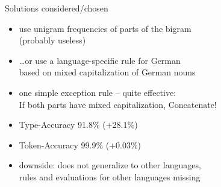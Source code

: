 \begin{frame}
  {Solutions considered\slash chosen}
  \begin{itemize}
    \item use unigram frequencies of parts of the bigram\\
      (probably useless)
    \item \ldots or use a language-specific rule for German\\
      based on mixed capitalization of German nouns
    \item \alert{one} simple exception rule -- quite effective:\\
      \alert{If both parts have mixed capitalization, Concatenate!}
    \item \alert{Type-Accuracy 91.8\% (+28.1\%)}
    \item \alert{Token-Accuracy 99.9\% (+0.03\%)}
    \item downside: does not generalize to other languages,\\
      rules and evaluations for other languages missing
  \end{itemize}
\end{frame}
